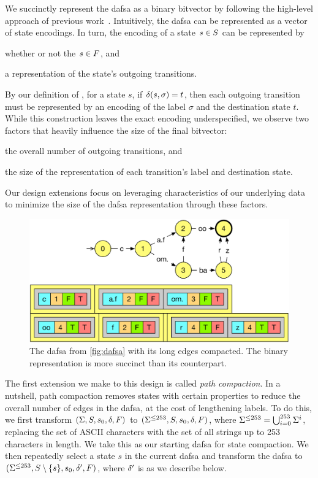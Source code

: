 We succinctly represent the \ac{dafsa} as a binary bitvector by following the
high-level approach of previous work~\cite{daciuk2012smaller}. Intuitively, the
\ac{dafsa} can be represented as a vector of state encodings. In turn, the
encoding of a state $s \in S$ can be represented by
\begin{inparaenum}
\item whether or not the $s \in F$, and
\item a representation of the state's outgoing transitions.
\end{inparaenum}
By our definition of \transfunc, for a state $s$, if $\delta(s, \sigma) =
t$, then each outgoing transition must be represented by an encoding of the
label $\sigma$ and the destination state $t$. While this construction leaves the
exact encoding underspecified, we observe two factors that heavily influence the
size of the final bitvector:
\begin{inparaenum}
\item the overall number of outgoing transitions, and
\item the size of the representation of each transition's label and destination
  state.
\end{inparaenum}
Our design extensions focus on leveraging characteristics of our underlying data
to minimize the size of the \ac{dafsa} representation through these factors.

\begin{figure}
  \centering
  \includegraphics[width=\linewidth]{fig/dafsa_compact}
  \caption{The \ac{dafsa} from \autoref{fig:dafsa} with its long edges
  compacted. The binary representation is more succinct than its counterpart.}
  \label{fig:dafsa_compact}
\end{figure}

The first extension we make to this design is called \emph{path compaction}. In
a nutshell, path compaction removes states with certain properties to reduce the
overall number of edges in the \ac{dafsa}, at the cost of lengthening labels. To
do this, we first transform $(\Sigma, S, s_0, \delta,
F)$ to $(\Sigma^{\le 253}, S, s_0, \delta,
F)$, where $\Sigma^{\le 253} = \bigcup_{i=0}^{253} \Sigma^i$,
replacing the set of ASCII characters with the set of all strings up to 253
characters in length. We take this as our starting \ac{dafsa} for state
compaction. We then repeatedly select a state $s$ in the current \ac{dafsa} and
transform the \ac{dafsa} to $(\Sigma^{\le 253}, S \setminus \{s\},
s_0, \delta', F)$, where $\delta'$ is as we describe
below.

